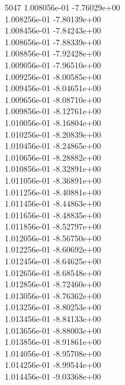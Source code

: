 5047	1.008056e-01	-7.76029e+00	\\ 	1.008256e-01	-7.80139e+00	\\ 	1.008456e-01	-7.84243e+00	\\ 	1.008656e-01	-7.88339e+00	\\ 	1.008856e-01	-7.92428e+00	\\ 	1.009056e-01	-7.96510e+00	\\ 	1.009256e-01	-8.00585e+00	\\ 	1.009456e-01	-8.04651e+00	\\ 	1.009656e-01	-8.08710e+00	\\ 	1.009856e-01	-8.12761e+00	\\ 	1.010056e-01	-8.16804e+00	\\ 	1.010256e-01	-8.20839e+00	\\ 	1.010456e-01	-8.24865e+00	\\ 	1.010656e-01	-8.28882e+00	\\ 	1.010856e-01	-8.32891e+00	\\ 	1.011056e-01	-8.36891e+00	\\ 	1.011256e-01	-8.40881e+00	\\ 	1.011456e-01	-8.44863e+00	\\ 	1.011656e-01	-8.48835e+00	\\ 	1.011856e-01	-8.52797e+00	\\ 	1.012056e-01	-8.56750e+00	\\ 	1.012256e-01	-8.60692e+00	\\ 	1.012456e-01	-8.64625e+00	\\ 	1.012656e-01	-8.68548e+00	\\ 	1.012856e-01	-8.72460e+00	\\ 	1.013056e-01	-8.76362e+00	\\ 	1.013256e-01	-8.80253e+00	\\ 	1.013456e-01	-8.84133e+00	\\ 	1.013656e-01	-8.88003e+00	\\ 	1.013856e-01	-8.91861e+00	\\ 	1.014056e-01	-8.95708e+00	\\ 	1.014256e-01	-8.99544e+00	\\ 	1.014456e-01	-9.03368e+00	\\ \hline
